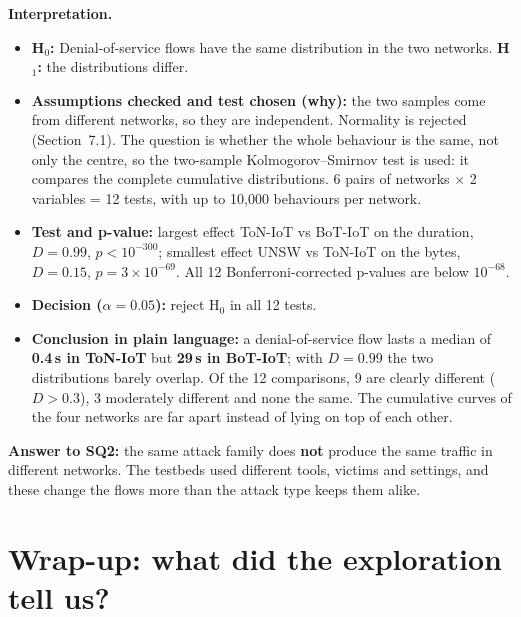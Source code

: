 \documentclass[11pt,a4paper]{article}
\newenvironment{reading}{\par\smallskip\noindent\textbf{\color{navy}Interpretation.}\ }{\par\medskip}
\begin{document}
\begin{reading}
\begin{itemize}
  \item \textbf{H$_0$:} Denial-of-service flows have the same distribution in the two networks. \textbf{H$_1$:} the
        distributions differ.
  \item \textbf{Assumptions checked and test chosen (why):} the two samples come from different networks, so they are
        independent. Normality is rejected (Section~7.1). The question is whether the whole behaviour is the same, not
        only the centre, so the two-sample Kolmogorov--Smirnov test is used: it compares the complete cumulative
        distributions. 6 pairs of networks $\times$ 2 variables = 12 tests, with up to 10,000 behaviours per network.
  \item \textbf{Test and p-value:} largest effect ToN-IoT vs BoT-IoT on the duration, $D = 0.99$, $p < 10^{-300}$;
        smallest effect UNSW vs ToN-IoT on the bytes, $D = 0.15$, $p = 3\times10^{-69}$. All 12 Bonferroni-corrected
        p-values are below $10^{-68}$.
  \item \textbf{Decision ($\alpha = 0.05$):} reject H$_0$ in all 12 tests.
  \item \textbf{Conclusion in plain language:} a denial-of-service flow lasts a median of \textbf{0.4\,s in ToN-IoT}
        but \textbf{29\,s in BoT-IoT}; with $D = 0.99$ the two distributions barely overlap. Of the 12 comparisons,
        9 are clearly different ($D > 0.3$), 3 moderately different and none the same. The cumulative curves of the
        four networks are far apart instead of lying on top of each other.
\end{itemize}
\textbf{Answer to SQ2:} the same attack family does \textbf{not} produce the same traffic in different networks. The
testbeds used different tools, victims and settings, and these change the flows more than the attack type keeps them
alike.
\end{reading}

\section{Wrap-up: what did the exploration tell us?}
\end{document}
